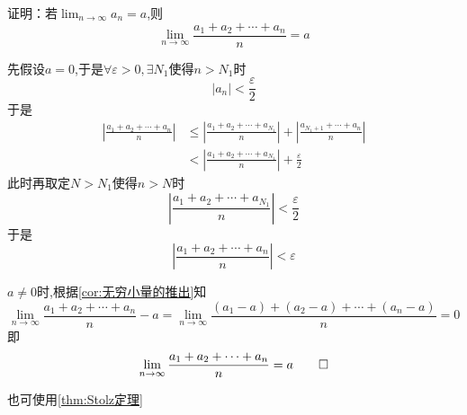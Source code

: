 \begin{brown}
    \begin{example}
        证明：若$\displaystyle \lim_{n\to\infty}a_n=a$,则\[
        \lim_{n\to\infty}\frac{a_1+a_2+\cdots+a_n}{n}=a
        \]
    \end{example}
    \begin{Proof}
        先假设$a=0$,于是$\forall \varepsilon>0,\exists N_1$使得$n>N_1$时\[
        \left|a_n\right|<\frac{\varepsilon}{2}
        \]于是\begin{align*}
            \left|\frac{
            a_1+a_2+\cdots+a_n
            }{n}\right|&\leqslant\left|\frac{
                a_1+a_2+\cdots+a_{N_1}
            }{n}\right|+\left|\frac{
                a_{N_1+1}+\cdots+a_n
            }{n}\right|\\
            &<\left|
                \frac{
                    a_1+a_2+\cdots+a_{N_1}
                }{n}
            \right|+\frac{\varepsilon}{2}
        \end{align*}此时再取定$N>N_1$使得$n>N$时\[
        \left|
            \frac{
                a_1+a_2+\cdots+a_{N_1}
            }{n}
        \right|<\frac{\varepsilon}{2}
        \]于是\[
        \left|
            \frac{
                a_1+a_2+\cdots+a_n
            }{n}
        \right|<\varepsilon
        \]

        $a\neq 0$时,根据\cref{cor:无穷小量的推出}知\[
        \lim_{n\to\infty}\frac{a_1+a_2+\cdots+a_n}{n}-a=\lim_{n\to\infty}\frac{\left(a_1-a\right)+\left(a_2-a\right)+\cdots+\left(a_n-a\right)}{n}=0
        \]即\[
        \lim_{n\to\infty}\frac{a_1+a_2+\cdots+a_n}{n}=a\qedhere
        \]

        也可使用\cref{thm:Stolz定理}
    \end{Proof}
\end{brown}
